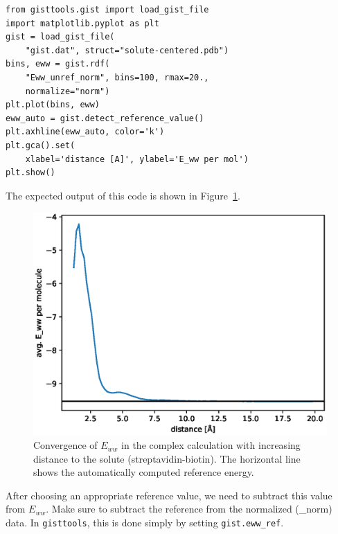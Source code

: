 \documentclass[9pt,tutorial]{livecoms}
\newcommand{\software}{\texttt}
\newcommand{\todo}{\textcolor{red}}
\newcommand\inlinecode{\texttt}
\begin{document}
\begin{lstlisting}[style=python]
from gisttools.gist import load_gist_file
import matplotlib.pyplot as plt
gist = load_gist_file(
    "gist.dat", struct="solute-centered.pdb")
bins, eww = gist.rdf(
    "Eww_unref_norm", bins=100, rmax=20.,
    normalize="norm")
plt.plot(bins, eww)
eww_auto = gist.detect_reference_value()
plt.axhline(eww_auto, color='k')
plt.gca().set(
    xlabel='distance [A]', ylabel='E_ww per mol')
plt.show()
\end{lstlisting}

The expected output of this code is shown in Figure~\ref{fig_ewwref}.

\begin{figure}
	\centering
	\includegraphics[width=0.8\linewidth]{figures/Eww_convergence.eps}
	\caption{Convergence of $E_{ww}$ in the complex calculation with increasing distance to the solute (streptavidin-biotin). The horizontal line shows the automatically computed reference energy.}\label{fig_ewwref}
\end{figure}

After choosing an appropriate reference value, we need to subtract this value from $E_{ww}$.
Make sure to subtract the reference from the normalized (\_norm) data.
In \software{gisttools}, this is done simply by setting \inlinecode{gist.eww\_ref}.

\end{document}
